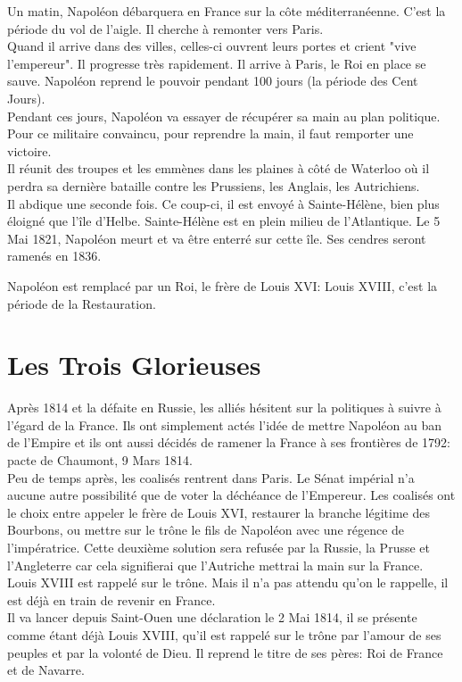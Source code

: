 \documentclass[10pt, a4paper, openany]{book}
\begin{document}
Un matin, Napoléon débarquera en France sur la côte méditerranéenne. C'est la période du vol de l'aigle. Il cherche à remonter vers Paris. \\
Quand il arrive dans des villes, celles-ci ouvrent leurs portes et crient "vive l'empereur". Il progresse très rapidement. Il arrive à Paris, le Roi en place se sauve. Napoléon reprend le pouvoir pendant 100 jours (la période des Cent Jours). \\
Pendant ces jours, Napoléon va essayer de récupérer sa main au plan politique. Pour ce militaire convaincu, pour reprendre la main, il faut remporter une victoire. \\
Il réunit des troupes et les emmènes dans les plaines à côté de Waterloo où il perdra sa dernière bataille contre les Prussiens, les Anglais, les Autrichiens. \\
Il abdique une seconde fois. Ce coup-ci, il est envoyé à Sainte-Hélène, bien plus éloigné que l'île d'Helbe. Sainte-Hélène est en plein milieu de l'Atlantique. Le 5 Mai 1821, Napoléon meurt et va être enterré sur cette île. Ses cendres seront ramenés en 1836. 


Napoléon est remplacé par un Roi, le frère de Louis XVI: Louis XVIII, c'est la période de la Restauration. 

\chapter{Les Trois Glorieuses}

Après 1814 et la défaite en Russie, les alliés hésitent sur la politiques à suivre à l'égard de la France. Ils ont simplement actés l'idée de mettre Napoléon au ban de l'Empire et ils ont aussi décidés de ramener la France à ses frontières de 1792: pacte de Chaumont, 9 Mars 1814. \\
Peu de temps après, les coalisés rentrent dans Paris. Le Sénat impérial n'a aucune autre possibilité que de voter la déchéance de l'Empereur. Les coalisés ont le choix entre appeler le frère de Louis XVI, restaurer la branche légitime des Bourbons, ou mettre sur le trône le fils de Napoléon avec une régence de l'impératrice. Cette deuxième solution sera refusée par la Russie, la Prusse et l'Angleterre car cela signifierai que l'Autriche mettrai la main sur la France. \\
Louis XVIII est rappelé sur le trône. Mais il n'a pas attendu qu'on le rappelle, il est déjà en train de revenir en France. \\
Il va lancer depuis Saint-Ouen une déclaration le 2 Mai 1814, il se présente comme étant déjà Louis XVIII, qu'il est rappelé sur le trône par l'amour de ses peuples et par la volonté de Dieu. Il reprend le titre de ses pères: Roi de France et de Navarre.
\end{document}
